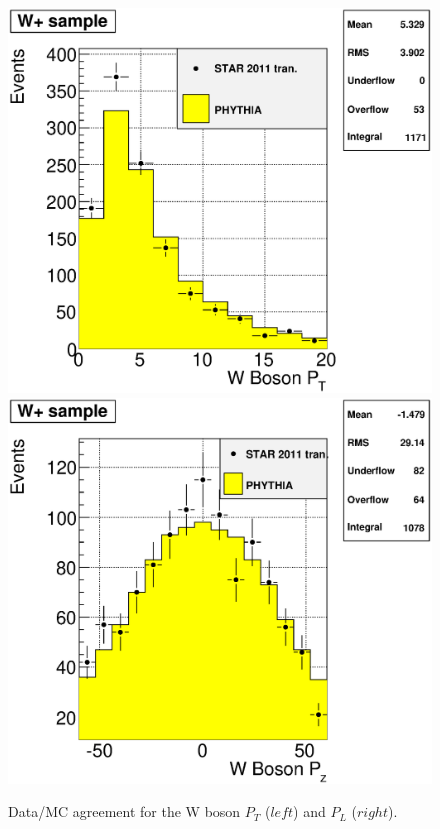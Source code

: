 \documentclass[12pt]{article}
\begin{document}

\begin{figure}[htbp]
\begin{center}
\includegraphics[scale=0.4]{images/DataMC/plot_DataMc_WpPt}
\includegraphics[scale=0.4]{images/DataMC/plot_DataMc_WpPz}
\end{center}
\caption{Data/MC agreement for the W boson $P_{T}$ ($left$) and $P_{L}$ ($right$).}
\label{fig:plot_DataMc_Wp} 
\end{figure}
\end{document}
